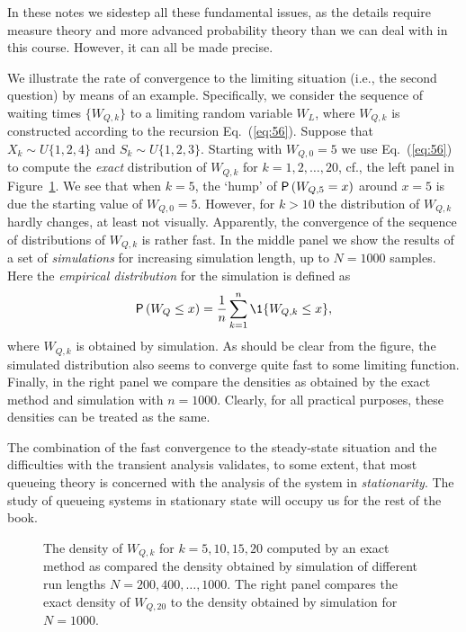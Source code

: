 In these notes we sidestep all these fundamental issues, as the
details require measure theory and more advanced probability theory
than we can deal with in this course. However, it can all be made
precise. 

We illustrate the rate of convergence to the limiting situation (i.e., the second question) by means of an example. Specifically, we consider the sequence of waiting times $\{W_{Q,k}\}$ to a limiting random variable $W_L$, where $W_{Q,k}$ is constructed according to the recursion
Eq.~(\ref{eq:56}). Suppose that $X_k\sim U\{1,2,4\}$ and
$S_k\sim U\{1,2,3\}$.  Starting with $W_{Q,0}=5$ we use
Eq.~(\ref{eq:56}) to compute the \emph{exact} distribution of
$W_{Q,k}$ for $k=1,2,\ldots, 20$, cf., the left panel in
Figure~\ref{fig:convergence}. We see that when $k=5$, the `hump' of
$\P{W_{Q,5}=x}$ around $x=5$ is due the starting value of
$W_{Q,0}=5$. However, for $k>10$ the distribution of $W_{Q,k}$ hardly
changes, at least not visually. Apparently, the convergence of the
sequence of distributions of $W_{Q,k}$ is rather fast. In the middle
panel we show the results of a set of \emph{simulations} for
increasing simulation length, up to $N=1000$ samples. Here the
\emph{empirical distribution} for the simulation is defined as
\begin{equation*}
\P{W_Q\leq x} =   \frac 1n \sum_{k=1}^n \1{W_{Q,k} \leq x},
\end{equation*}
where $W_{Q,k}$ is obtained by simulation. As should be clear from the
figure, the simulated distribution also seems to converge quite fast to
some limiting function. Finally, in the right panel we compare
the densities as obtained by the exact method and simulation with
$n=1000$. Clearly, for all practical purposes, these densities can be
treated as the same.

The combination of the fast convergence to the steady-state situation
and the difficulties with the transient analysis validates, to some
extent, that most queueing theory is concerned with the analysis of
the system in \emph{stationarity}. The study of queueing systems in
stationary state will occupy us for the rest of the book.

\begin{figure}
  \centering



  \caption{The density of $W_{Q,k}$ for $k=5, 10, 15, 20$ computed by
    an exact method as compared the density obtained by simulation of
    different run lengths $N=200, 400, \ldots, 1000$. The right panel
    compares the exact density of $W_{Q,20}$ to the density obtained by simulation
    for $N=1000$.}
\label{fig:convergence}
\end{figure}





